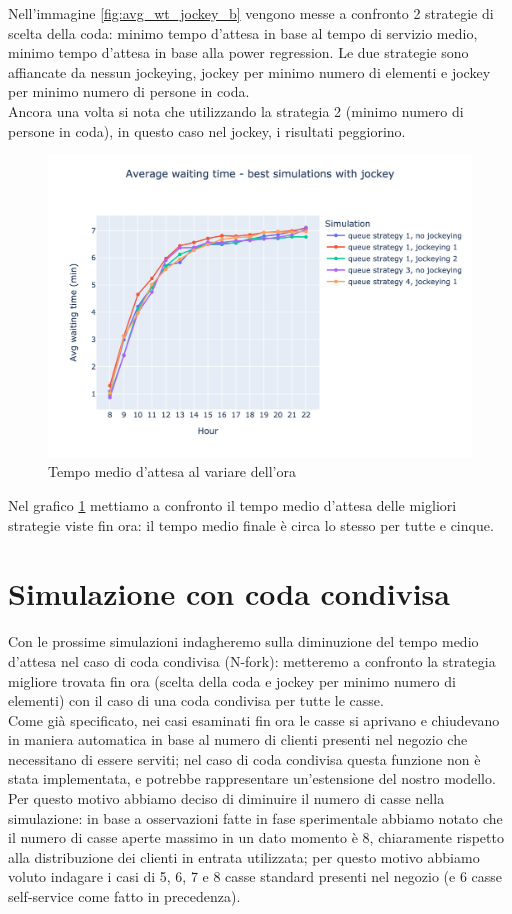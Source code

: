 Nell'immagine \ref{fig:avg_wt_jockey_b} vengono messe a confronto 2 strategie di scelta della coda: minimo tempo d'attesa in base al tempo di servizio medio, minimo tempo d'attesa in base alla power regression. Le due strategie sono affiancate da nessun jockeying, jockey per minimo numero di elementi e jockey per minimo numero di persone in coda. \\
Ancora una volta si nota che utilizzando la strategia 2 (minimo numero di persone in coda), in questo caso nel jockey, i risultati peggiorino.

\begin{figure}[H]
	\centering
	\includegraphics[width=12cm]{"images/results/avg_wt_jockey_best.png"}
	\caption{Tempo medio d'attesa al variare dell'ora}
	\label{fig:avg_wt_jockey_best}
\end{figure}

Nel grafico \ref{fig:avg_wt_jockey_best} mettiamo a confronto il tempo medio d'attesa delle migliori strategie viste fin ora: il tempo medio finale è circa lo stesso per tutte e cinque.

\section{Simulazione con coda condivisa}

Con le prossime simulazioni indagheremo sulla diminuzione del tempo medio d'attesa nel caso di coda condivisa (N-fork): metteremo a confronto la strategia migliore trovata fin ora (scelta della coda e jockey per minimo numero di elementi) con il caso di una coda condivisa per tutte le casse. \\
Come già specificato, nei casi esaminati fin ora le casse si aprivano e chiudevano in maniera automatica in base al numero di clienti presenti nel negozio che necessitano di essere serviti; nel caso di coda condivisa questa funzione non è stata implementata, e potrebbe rappresentare un'estensione del nostro modello. Per questo motivo abbiamo deciso di diminuire il numero di casse nella simulazione: in base a osservazioni fatte in fase sperimentale abbiamo notato che il numero di casse aperte massimo in un dato momento è 8, chiaramente rispetto alla distribuzione dei clienti in entrata utilizzata; per questo motivo abbiamo voluto indagare i casi di 5, 6, 7 e 8 casse standard presenti nel negozio (e 6 casse self-service come fatto in precedenza).

